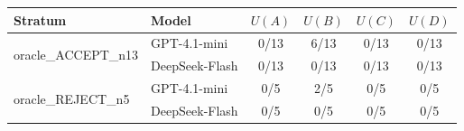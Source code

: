 \begin{tabular}{llcccc}
\toprule
Stratum & Model & $U(A)$ & $U(B)$ & $U(C)$ & $U(D)$ \\
\midrule
\multirow{2}{*}{oracle\_ACCEPT\_n13} & GPT-4.1-mini & 0/13 & 6/13 & 0/13 & 0/13 \\
 & DeepSeek-Flash & 0/13 & 0/13 & 0/13 & 0/13 \\
\midrule
\multirow{2}{*}{oracle\_REJECT\_n5} & GPT-4.1-mini & 0/5 & 2/5 & 0/5 & 0/5 \\
 & DeepSeek-Flash & 0/5 & 0/5 & 0/5 & 0/5 \\
\bottomrule
\end{tabular}
